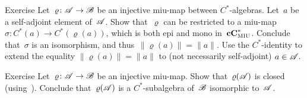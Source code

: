 \documentclass[a]{subfiles}
\begin{document}
\begin{parsec}
\begin{point}{Exercise}
Let~$\varrho\colon \mathscr{A}\to\mathscr{B}$
be an injective miu-map between $C^*$-algebras.
Let~$a$ be a self-adjoint element of~$\mathscr{A}$.
Show that~$\varrho$ can be restricted
to a miu-map $\sigma\colon C^*(a)\to C^*(\varrho(a))$,
which is both epi and mono in~$\mathbf{cC}^*_{\text{\textsc{MIU}}}$.
Conclude that~$\sigma$ is an isomorphism,
and thus~$\|\varrho(a)\|=\|a\|$.
Use the $C^*$-identity
to extend the equality $\|\varrho(a)\|=\|a\|$ 
to (not necessarily self-adjoint) $a\in \mathscr{A}$.
\end{point}
\begin{point}{Exercise}%
Let~$\varrho\colon \mathscr{A}\to\mathscr{B}$ 
be an injective miu-map.
Show that~$\varrho(\mathscr{A})$
is closed (using~).
Conclude that~$\varrho(\mathscr{A})$
is a
 $C^*$-subalgebra of~$\mathscr{B}$
isomorphic to~$\mathscr{A}$.
\end{point}
\end{parsec}
\end{document}
